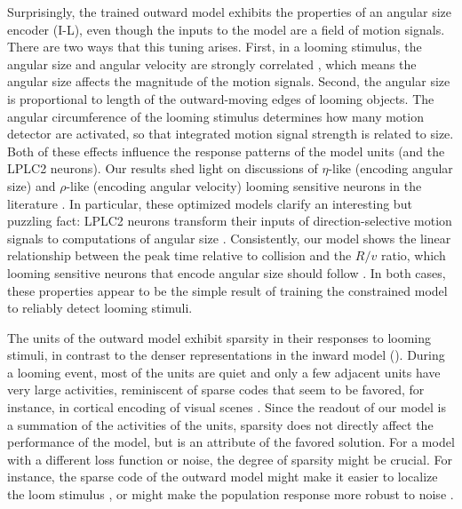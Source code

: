 \documentclass[pdftex,9pt,lineno]{elife}
\begin{document}
Surprisingly, the trained outward model exhibits the properties of an angular size encoder (I-L), even though the inputs to the model are a field of motion signals. There are two ways that this tuning arises. First, in a looming stimulus, the angular size and angular velocity are strongly correlated \citep{gabbiani1999computation}, which means the angular size affects the magnitude of the motion signals. Second, the angular size is proportional to length of the outward-moving edges of looming objects. The angular circumference of the looming stimulus determines how many motion detector are activated, so that integrated motion signal strength is related to size. Both of these effects influence the response patterns of the model units (and the LPLC2 neurons). 
Our results shed light on discussions of $\eta$-like (encoding angular size) and $\rho$-like (encoding angular velocity) looming sensitive neurons in the literature \citep{gabbiani1999computation,wu2005tectal,liu2011neuronal,shang2015parvalbumin,temizer2015visual,dunn2016neural,von2017feature,ache2019neural}. In particular, these optimized models clarify an interesting but puzzling fact: LPLC2 neurons transform their inputs of direction-selective motion signals to computations of angular size \citep{ache2019neural}. Consistently, our model shows the linear relationship between the peak time relative to collision and the $R/v$ ratio, which looming sensitive neurons that encode angular size should follow \citep{peek2016comparative}. In both cases, these properties appear to be the simple result of training the constrained model to reliably detect looming stimuli.

The units of the outward model exhibit sparsity in their responses to looming stimuli, in contrast to the denser representations in the inward model (). During a looming event, most of the units are quiet and only a few adjacent units have very large activities, reminiscent of sparse codes that seem to be favored, for instance, in cortical encoding of visual scenes \citep{olshausen1996emergence,olshausen1997sparse}. Since the readout of our model is a summation of the activities of the units, sparsity does not directly affect the performance of the model, but is an attribute of the favored solution. For a model with a different loss function or noise, the degree of sparsity might be crucial. For instance, the sparse code of the outward model might make it easier to localize the loom stimulus \citep{morimoto2020spatial}, or might make the population response more robust to noise \citep{field1994goal}. 
\end{document}
